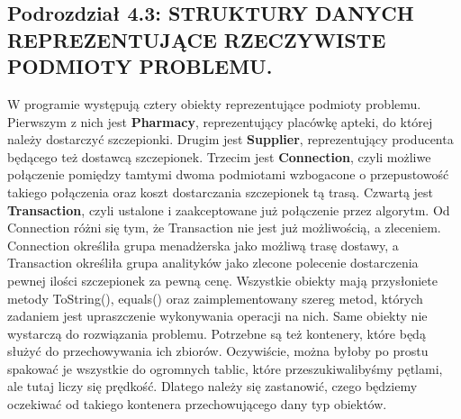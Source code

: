 \documentclass[a4paper]{article}
\newcommand\tab[1][1cm]{\hspace*{#1}}
\begin{document}
\subsection*{Podrozdział 4.3: STRUKTURY DANYCH REPREZENTUJĄCE RZECZYWISTE PODMIOTY PROBLEMU.}
W programie występują cztery obiekty reprezentujące podmioty problemu. Pierwszym z nich jest \textbf{Pharmacy}, reprezentujący placówkę apteki, do której należy dostarczyć szczepionki. Drugim jest \textbf{Supplier}, reprezentujący producenta będącego też dostawcą szczepionek. Trzecim jest \textbf{Connection}, czyli możliwe połączenie pomiędzy tamtymi dwoma podmiotami wzbogacone o przepustowość takiego połączenia oraz koszt dostarczania szczepionek tą trasą. Czwartą jest \textbf{Transaction}, czyli ustalone i zaakceptowane już połączenie przez algorytm. Od Connection różni się tym, że Transaction nie jest już możliwością, a zleceniem. Connection określiła grupa menadżerska jako możliwą trasę dostawy, a Transaction określiła grupa analityków jako zlecone polecenie dostarczenia pewnej ilości szczepionek za pewną cenę. Wszystkie obiekty mają przysłoniete metody ToString(), equals() oraz zaimplementowany szereg metod, których zadaniem jest upraszczenie wykonywania operacji na nich.
\newline \tab Same obiekty nie wystarczą do rozwiązania problemu. Potrzebne są też kontenery, które będą służyć do przechowywania ich zbiorów. Oczywiście, można byłoby po prostu spakować je wszystkie do ogromnych tablic, które przeszukiwalibyśmy pętlami, ale tutaj liczy się prędkość. Dlatego należy się zastanowić, czego będziemy oczekiwać od takiego kontenera przechowującego dany typ obiektów. 
\end{document}
